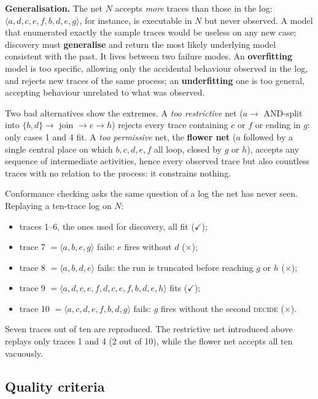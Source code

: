 \textbf{Generalisation.} The net $N$ accepts \emph{more} traces than those in the log: $\langle a, d, c, e, f, b, d, e, g\rangle$, for instance, is executable in $N$ but never observed. A model that enumerated exactly the sample traces would be useless on any new case; discovery must \textbf{generalise} and return the most likely underlying model consistent with the past. It lives between two failure modes. An \textbf{overfitting} model is too specific, allowing only the accidental behaviour observed in the log, and rejects new traces of the same process; an \textbf{underfitting} one is too general, accepting behaviour unrelated to what was observed.

Two bad alternatives show the extremes. A \emph{too restrictive} net ($a \to$ AND-split into $\{b, d\} \to$ join $\to e \to h$) rejects every trace containing $c$ or $f$ or ending in $g$: only cases 1 and 4 fit. A \emph{too permissive} net, the \textbf{flower net} ($a$ followed by a single central place on which $b, c, d, e, f$ all loop, closed by $g$ or $h$), accepts any sequence of intermediate activities, hence every observed trace but also countless traces with no relation to the process: it constrains nothing.

Conformance checking asks the same question of a log the net has never seen. Replaying a ten-trace log on $N$:
\begin{itemize}
  \item traces 1--6, the ones used for discovery, all fit ($\checkmark$);
  \item trace 7 $= \langle a, b, e, g\rangle$ fails: $e$ fires without $d$ ($\times$);
  \item trace 8 $= \langle a, b, d, e\rangle$ fails: the run is truncated before reaching $g$ or $h$ ($\times$);
  \item trace 9 $= \langle a, d, c, e, f, d, c, e, f, b, d, e, h\rangle$ fits ($\checkmark$);
  \item trace 10 $= \langle a, c, d, e, f, b, d, g\rangle$ fails: $g$ fires without the second \textsc{decide} ($\times$).
\end{itemize}
Seven traces out of ten are reproduced. The restrictive net introduced above replays only traces 1 and 4 (2 out of 10), while the flower net accepts all ten vacuously.

\subsection{Quality criteria}


